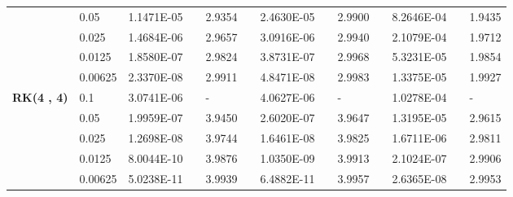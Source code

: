 \begin{table}[H]
\begin{tabular}{lllllrlrlrlrlrl}
\multicolumn{2}{l}{} & \multicolumn{2}{l}{0.05} & 1.1471E-05 &       & 2.9354  &       & 2.4630E-05 &       & 2.9900  &       & 8.2646E-04 &       & 1.9435  \\
\multicolumn{2}{l}{} & \multicolumn{2}{l}{0.025} & 1.4684E-06 &       & 2.9657  &       & 3.0916E-06 &       & 2.9940  &       & 2.1079E-04 &       & 1.9712  \\
\multicolumn{2}{l}{} & \multicolumn{2}{l}{0.0125} & 1.8580E-07 &       & 2.9824  &       & 3.8731E-07 &       & 2.9968  &       & 5.3231E-05 &       & 1.9854  \\
\multicolumn{2}{l}{} & \multicolumn{2}{l}{0.00625} & 2.3370E-08 &       & 2.9911  &       & 4.8471E-08 &       & 2.9983  &       & 1.3375E-05 &       & 1.9927  \\
\multicolumn{2}{l}{\multirow{5}[1]{*}{\textbf{RK(4 , 4)}}} & \multicolumn{2}{l}{0.1} & 3.0741E-06 &       & -     &       & 4.0627E-06 &       & -     &       & 1.0278E-04 &       & - \\
\multicolumn{2}{l}{} & \multicolumn{2}{l}{0.05} & 1.9959E-07 &       & 3.9450  &       & 2.6020E-07 &       & 3.9647  &       & 1.3195E-05 &       & 2.9615  \\
\multicolumn{2}{l}{} & \multicolumn{2}{l}{0.025} & 1.2698E-08 &       & 3.9744  &       & 1.6461E-08 &       & 3.9825  &       & 1.6711E-06 &       & 2.9811  \\
\multicolumn{2}{l}{} & \multicolumn{2}{l}{0.0125} & 8.0044E-10 &       & 3.9876  &       & 1.0350E-09 &       & 3.9913  &       & 2.1024E-07 &       & 2.9906  \\
\multicolumn{2}{l}{} & \multicolumn{2}{l}{0.00625} & 5.0238E-11 &       & 3.9939  &       & 6.4882E-11 &       & 3.9957  &       & 2.6365E-08 &       & 2.9953  \\
\bottomrule
\end{tabular}%
\label{tab_SAVRRK:6-4}%
\end{table}%
\vspace{-8mm}
